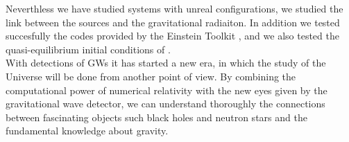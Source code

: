 Neverthless we have studied systems with unreal configurations, we studied the link between the sources and the gravitational radiaiton.
In addition we tested succesfully the codes provided by the Einstein Toolkit \cite{EinsteinToolkit:web}, and we also tested the quasi-equilibrium initial conditions of \cite{tichy_quasi-equilibrium_2004}.\\
With detections of GWs \cite{abbott_gw170817:_2017,abbott_observation_2016}
it has started a new era, in which the study of the Universe will be done from another point of view.
By combining the computational power of numerical relativity with the new eyes given by the gravitational wave detector, we can understand thoroughly the connections between fascinating objects such black holes and neutron stars and the fundamental knowledge about gravity.
